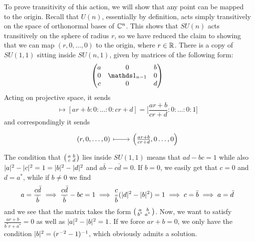 To prove transitivity of this action, we will show that any point can be mapped to the origin. Recall that $U(n)$, essentially by definition, acts simply transitively on the space of orthonormal bases of $\mathbb{C}^n$. This shows that $SU(n)$ acts transitively on the sphere of radius $r$, so we have reduced the claim to showing that we can map $(r,0,\dots,0)$ to the origin, where $r\in \mathbb{R}$. There is a copy of $SU(1,1)$ sitting inside $SU(n,1)$, given by matrices of the following form:
\begin{equation*}
	\begin{pmatrix}
		a 	& 0				& b \\ 
		0 	&\Unit_{n-1} 	& 0 \\
		c 	& 0				& d
	\end{pmatrix}
\end{equation*}
Acting on projective space, it sends
\begin{equation*}
	[r:0:\dots:0:1]\mapsto [ar+b:0:\dots:0:cr+d]=\bigg[\frac{ar+b}{cr+d}:0:\dots: 0 : 1\bigg]
\end{equation*}
and correspondingly it sends
\begin{equation*}
	\begin{tikzcd}
		(r,0,\dots, 0) \ar[r,mapsto] & \Big(\frac{ar+b}{cr+d},0\dots,0\Big)
	\end{tikzcd}
\end{equation*}
The condition that 
$\begin{psmallmatrix}
	a & b \\ c & d
\end{psmallmatrix}$ lies inside $SU(1,1)$ means that $ad-bc=1$ while also $\lvert a \rvert^2-\lvert c \rvert^2=1=\lvert b \rvert^2-\lvert d \rvert^2$ and $a\bar b-c \bar d=0$. If $b=0$, we easily get that $c=0$ and $d=a^*$, while if $b\neq 0$ we find
\begin{equation*}
	a=\frac{c\bar d }{\bar b}\implies \frac{c\bar d}{\bar b}-bc=1
	\implies \frac{c}{\bar b}(\lvert d \rvert^2-\lvert b \rvert^2)=1\implies c=\bar b\implies a=\bar d
\end{equation*}
and we see that the matrix takes the form
$\begin{psmallmatrix}
a & b \\ b^* & a^*
\end{psmallmatrix}$. Now, we want to satisfy $\frac{ar+b}{b^*r+a^*}=0$ as well as $\lvert a \rvert^2-\lvert b \rvert^2=1$. If we force $ar+b=0$, we only have the condition $\lvert b \rvert^2=(r^{-2}-1)^{-1}$, which obviously admits a solution.

